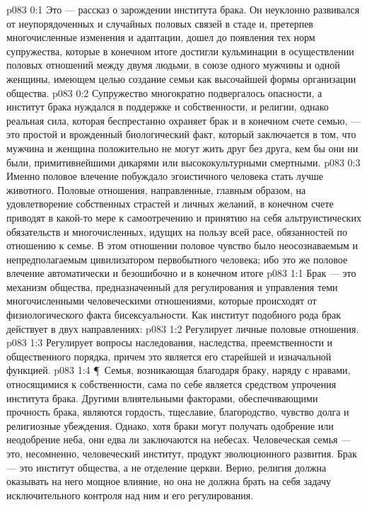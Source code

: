 \author{Глава Серафимов}
\vs p083 0:1 Это --- рассказ о зарождении института брака. Он неуклонно развивался от неупорядоченных и случайных половых связей в стаде и, претерпев многочисленные изменения и адаптации, дошел до появления тех норм супружества, которые в конечном итоге достигли кульминации в осуществлении половых отношений между двумя людьми, в союзе одного мужчины и одной женщины, имеющем целью создание семьи как высочайшей формы организации общества.
\vs p083 0:2 Супружество многократно подвергалось опасности, а институт брака нуждался в поддержке и собственности, и религии, однако реальная сила, которая беспрестанно охраняет брак и в конечном счете семью, --- это простой и врожденный биологический факт, который заключается в том, что мужчина и женщина положительно не могут жить друг без друга, кем бы они ни были, примитивнейшими дикарями или высококультурными смертными.
\vs p083 0:3 Именно половое влечение побуждало эгоистичного человека стать лучше животного. Половые отношения, направленные, главным образом, на удовлетворение собственных страстей и личных желаний, в конечном счете приводят в какой\hyp{}то мере к самоотречению и принятию на себя альтруистических обязательств и многочисленных, идущих на пользу всей расе, обязанностей по отношению к семье. В этом отношении половое чувство было неосознаваемым и непредполагаемым цивилизатором первобытного человека; ибо это же половое влечение автоматически и безошибочно  и в конечном итоге 
\vs p083 1:1 Брак --- это механизм общества, предназначенный для регулирования и управления теми многочисленными человеческими отношениями, которые происходят от физиологического факта бисексуальности. Как институт подобного рода брак действует в двух направлениях:
\vs p083 1:2 \bibnobreakspace Регулирует личные половые отношения.
\vs p083 1:3 \bibnobreakspace Регулирует вопросы наследования, наследства, преемственности и общественного порядка, причем это является его старейшей и изначальной функцией.
\vs p083 1:4 \P\ Семья, возникающая благодаря браку, наряду с нравами, относящимися к собственности, сама по себе является средством упрочения института брака. Другими влиятельными факторами, обеспечивающими прочность брака, являются гордость, тщеславие, благородство, чувство долга и религиозные убеждения. Однако, хотя браки могут получать одобрение или неодобрение неба, они едва ли заключаются на небесах. Человеческая семья --- это, несомненно, человеческий институт, продукт эволюционного развития. Брак --- это институт общества, а не отделение церкви. Верно, религия должна оказывать на него мощное влияние, но она не должна брать на себя задачу исключительного контроля над ним и его регулирования.

